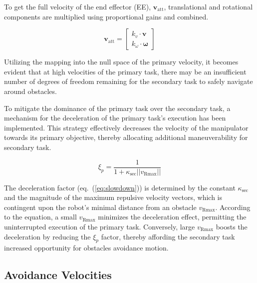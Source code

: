 \documentclass[letterpaper, 10 pt, conference]{ieeeconf}  %
\begin{document}
To get the full velocity of the end effector (EE), \( \mathrm{\mathbf{v}_{att}} \), translational and rotational components are multiplied using proportional gains and combined.

\begin{equation}
	\mathrm{\mathbf{v}_{att}} = 
	\begin{bmatrix}
		k_{v} \cdot \mathbf{v}   \\
		k_{\omega} \cdot \mathbf{\omega}
	\end{bmatrix}
	\label{eq:ee_velocity}
\end{equation}

Utilizing the mapping into the null space of the primary velocity, it becomes evident that at high velocities of the primary task, there may be an insufficient number of degrees of freedom remaining for the secondary task to safely navigate around obstacles. 


\label{chap:primary slowdown}

To mitigate the dominance of the primary task over the secondary task, a mechanism for the deceleration of the primary task's execution has been implemented. This strategy effectively decreases the velocity of the manipulator towards its primary objective, thereby allocating additional maneuverability for secondary task.

\begin{equation}
	\label{eq:slowdown}
	\xi_{p}=
	\frac{1}{1 + \kappa_{\text{sec}} ||v_{\text{Rmax}}||}
\end{equation}

The deceleration factor (eq.~(\ref{eq:slowdown})) is determined by the constant \( \kappa_{\text{sec}} \) and the magnitude of the maximum repulsive velocity vectors, which is contingent upon the robot's minimal distance from an obstacle \( v_{\text{Rmax}} \). According to the equation, a small \( v_{\text{Rmax}} \) minimizes the deceleration effect, permitting the uninterrupted execution of the primary task. Conversely, large \( v_{\text{Rmax}} \) boosts the deceleration by reducing the $\xi_{p}$ factor, thereby affording the secondary task increased opportunity for obstacles avoidance motion.


\subsection{Avoidance Velocities}
\end{document}
